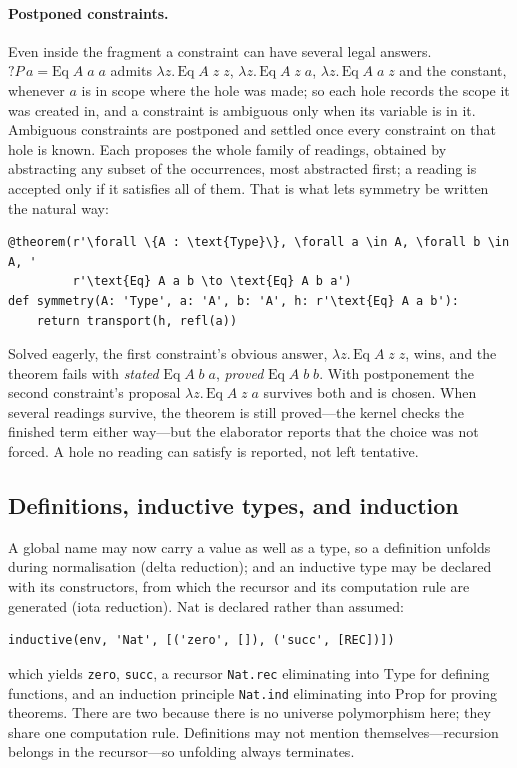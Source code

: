 \documentclass[11pt]{article}
\begin{document}
\paragraph{Postponed constraints.} Even inside the fragment a constraint can
have several legal answers. $?P\,a = \mathrm{Eq}\;A\;a\;a$ admits
$\lambda z.\,\mathrm{Eq}\;A\;z\;z$, $\lambda z.\,\mathrm{Eq}\;A\;z\;a$,
$\lambda z.\,\mathrm{Eq}\;A\;a\;z$ and the constant, whenever $a$ is in scope
where the hole was made; so each hole records the scope it was created in, and
a constraint is ambiguous only when its variable is in it. Ambiguous constraints
are postponed and settled once every constraint on that hole is known. Each
proposes the whole family of readings, obtained by abstracting any subset of the
occurrences, most abstracted first; a reading is accepted only if it satisfies
all of them. That is what lets symmetry be written the natural way:
\begin{lstlisting}
@theorem(r'\forall \{A : \text{Type}\}, \forall a \in A, \forall b \in A, '
         r'\text{Eq} A a b \to \text{Eq} A b a')
def symmetry(A: 'Type', a: 'A', b: 'A', h: r'\text{Eq} A a b'):
    return transport(h, refl(a))
\end{lstlisting}
Solved eagerly, the first constraint's obvious answer, $\lambda z.\,\mathrm{Eq}\;A\;z\;z$,
wins, and the theorem fails with \emph{stated} $\mathrm{Eq}\;A\;b\;a$, \emph{proved}
$\mathrm{Eq}\;A\;b\;b$. With postponement the second constraint's proposal
$\lambda z.\,\mathrm{Eq}\;A\;z\;a$ survives both and is chosen. When several
readings survive, the theorem is still proved---the kernel checks the finished
term either way---but the elaborator reports that the choice was not forced.
A hole no reading can satisfy is reported, not left tentative.

\subsection{Definitions, inductive types, and induction}

A global name may now carry a value as well as a type, so a definition unfolds
during normalisation (delta reduction); and an inductive type may be declared
with its constructors, from which the recursor and its computation rule are
generated (iota reduction). $\mathrm{Nat}$ is declared rather than assumed:
\begin{lstlisting}
inductive(env, 'Nat', [('zero', []), ('succ', [REC])])
\end{lstlisting}
which yields \verb|zero|, \verb|succ|, a recursor \verb|Nat.rec| eliminating
into $\mathrm{Type}$ for defining functions, and an induction principle
\verb|Nat.ind| eliminating into $\mathrm{Prop}$ for proving theorems. There are
two because there is no universe polymorphism here; they share one computation
rule. Definitions may not mention themselves---recursion belongs in the
recursor---so unfolding always terminates.
\end{document}
